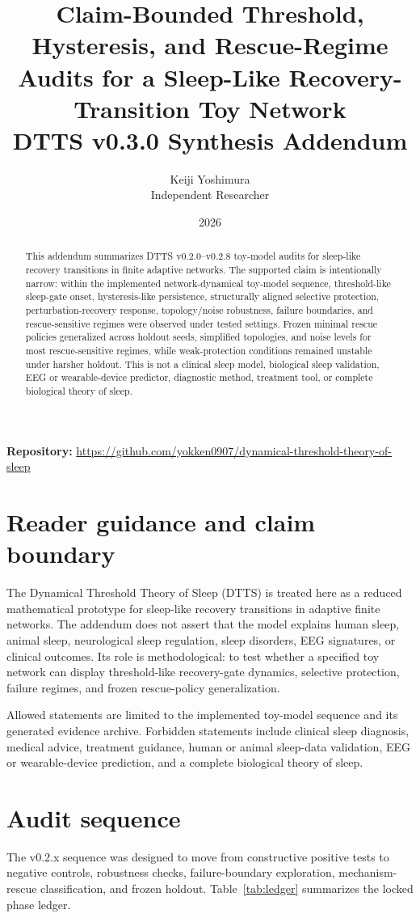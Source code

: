 \documentclass[11pt,a4paper]{article}
\title{Claim-Bounded Threshold, Hysteresis, and Rescue-Regime Audits for a Sleep-Like Recovery-Transition Toy Network\\\large DTTS v0.3.0 Synthesis Addendum}
\author{Keiji Yoshimura\\Independent Researcher}
\date{2026}
\begin{document}
\maketitle

\noindent\textbf{Repository:} \url{https://github.com/yokken0907/dynamical-threshold-theory-of-sleep}

\medskip

\begin{abstract}
This addendum summarizes DTTS v0.2.0--v0.2.8 toy-model audits for sleep-like recovery transitions in finite adaptive networks. The supported claim is intentionally narrow: within the implemented network-dynamical toy-model sequence, threshold-like sleep-gate onset, hysteresis-like persistence, structurally aligned selective protection, perturbation-recovery response, topology/noise robustness, failure boundaries, and rescue-sensitive regimes were observed under tested settings. Frozen minimal rescue policies generalized across holdout seeds, simplified topologies, and noise levels for most rescue-sensitive regimes, while weak-protection conditions remained unstable under harsher holdout. This is not a clinical sleep model, biological sleep validation, EEG or wearable-device predictor, diagnostic method, treatment tool, or complete biological theory of sleep.
\end{abstract}

\section{Reader guidance and claim boundary}
The Dynamical Threshold Theory of Sleep (DTTS) is treated here as a reduced mathematical prototype for sleep-like recovery transitions in adaptive finite networks. The addendum does not assert that the model explains human sleep, animal sleep, neurological sleep regulation, sleep disorders, EEG signatures, or clinical outcomes. Its role is methodological: to test whether a specified toy network can display threshold-like recovery-gate dynamics, selective protection, failure regimes, and frozen rescue-policy generalization.

Allowed statements are limited to the implemented toy-model sequence and its generated evidence archive. Forbidden statements include clinical sleep diagnosis, medical advice, treatment guidance, human or animal sleep-data validation, EEG or wearable-device prediction, and a complete biological theory of sleep.

\section{Audit sequence}
The v0.2.x sequence was designed to move from constructive positive tests to negative controls, robustness checks, failure-boundary exploration, mechanism-rescue classification, and frozen holdout. Table~\ref{tab:ledger} summarizes the locked phase ledger.
\end{document}
